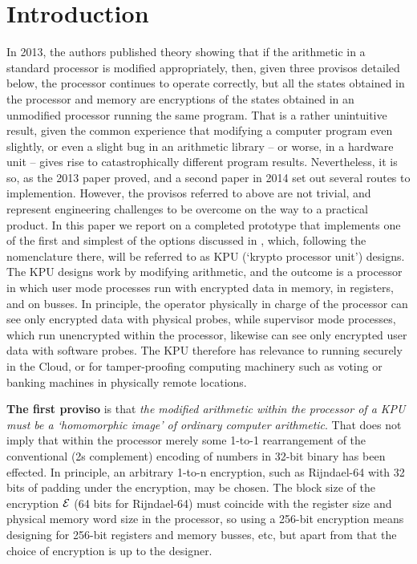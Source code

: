 \documentclass[conference]{IEEEtran}
\def\E{{\cal{E}}}
\def\para#1{{\bf{#1}}}
\begin{document}
\section{Introduction}
\IEEEPARstart
In 2013, the authors published theory \cite{BB13a} showing that if the
arithmetic in a standard processor is modified appropriately, then,
given three provisos detailed below, the processor continues to operate
correctly, but all the states obtained in the processor and memory are
encryptions of the states obtained in an unmodified processor running
the same program.  That is a rather unintuitive result, given the common
experience that modifying a computer program even slightly, or even a
slight bug in an arithmetic library -- or worse, in a hardware unit --
gives rise to catastrophically different program results.  Nevertheless,
it is so, as the 2013 paper proved, and a second paper in 2014
\cite{BB14b} set out several routes to implemention.  However, the
provisos referred to above are not trivial, and represent engineering
challenges to be overcome on the way to a practical product.  In this
paper we report on a completed prototype that implements one of the
first and simplest of the options discussed in \cite{BB14b}, which,
following the nomenclature there, will be referred to as KPU (`krypto
processor unit') designs.  The KPU designs work by modifying arithmetic,
and the outcome is a processor in which user mode processes run with
encrypted data in memory, in registers, and on busses.  In principle,
the operator physically in charge of the processor can see only
encrypted data with physical probes, while supervisor mode processes,
which run unencrypted within the processor, likewise can see only
encrypted user data with software probes.  The KPU therefore has
relevance to running securely in the Cloud, or for tamper-proofing
computing machinery such as voting or banking machines in physically
remote locations.


\para{The  first proviso} is that {\em the modified
arithmetic within the processor of a KPU must be a `homomorphic image'
of ordinary computer arithmetic}.  That does not imply that within the
processor merely some 1-to-1 rearrangement of the conventional (2s
complement) encoding of numbers in 32-bit binary has been effected.
In principle, an arbitrary 1-to-n encryption, such as Rijndael-64
\cite{DR2002}
with 32 bits of padding under the encryption, may be chosen.
The block size of the encryption $\E$ (64 bits for Rijndael-64) must
coincide with the register size and physical memory word size in the
processor, so using a 256-bit encryption means designing for
256-bit registers and memory busses, etc, but apart from that the choice
of encryption is up to the designer.
\end{document}

